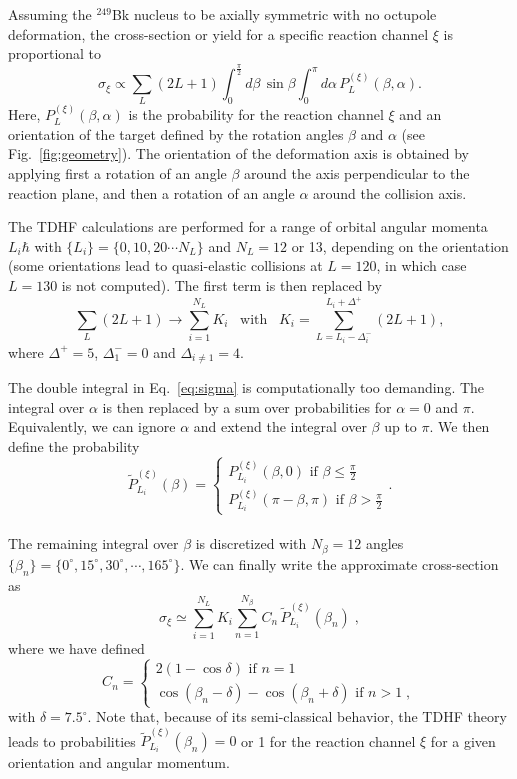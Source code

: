 \documentclass[reprint,aps,prc,twocolumn,floatfix,10pt]{revtex4-2}
\begin{document}
Assuming the $^{249}$Bk nucleus to be axially symmetric with no octupole deformation, the cross-section or yield for a specific reaction channel $\xi$ is proportional to
\begin{equation}
 \sigma_\xi\propto \sum_L (2L+1) \int_0^{\frac{\pi}{2}} d\beta \,\sin\beta \int_0^\pi d\alpha \,P_L^{(\xi)}(\beta,\alpha). \label{eq:sigma}
\end{equation}
Here, $P_L^{(\xi)}(\beta,\alpha)$ is the probability for the reaction channel $\xi$ and an orientation of the target defined by the rotation angles $\beta$ and $\alpha$ (see Fig.~\ref{fig:geometry}).
The orientation of the deformation axis is obtained by applying first a rotation of an angle $\beta$ around the axis perpendicular to the reaction plane, and then a rotation of an angle $\alpha$ around the collision axis.

The TDHF calculations are performed for a range of orbital angular momenta $L_i\hbar$ with $\{L_i\}=\{0,10,20\cdots N_L\}$ and $N_L=12$ or 13, depending on the orientation (some orientations lead to quasi-elastic collisions at $L=120$, in which case $L=130$ is not computed).
The first term is then replaced by $$\sum_L (2L+1) \rightarrow \sum_{i=1}^{N_L}K_i \,\,\,\mbox{~with~} \,\,\,
K_i=\sum_{L=L_i-\Delta_i^-}^{L_i+\Delta^+}(2L+1),$$
where $\Delta^+=5$, $\Delta_1^-=0$ and $\Delta_{i\ne 1}=4$.

The double integral in Eq.~\eqref{eq:sigma} is computationally too demanding.
The integral over $\alpha$ is then replaced by a sum over probabilities for $\alpha=0$ and $\pi$.
Equivalently, we can ignore $\alpha$ and extend the integral over $\beta$ up to $\pi$.
We then define the probability
$$\tilde{P}_{L_i}^{(\xi)}(\beta) = \begin{cases} P_{L_i}^{(\xi)}(\beta,0)\mbox{~if~}\beta\le\frac{\pi}{2}\\
P_{L_i}^{(\xi)}(\pi-\beta,\pi)\mbox{~if~}\beta > \frac{\pi}{2}\end{cases}.$$\\

The remaining integral over $\beta$ is discretized with $N_\beta=12$ angles $\{\beta_n\}=\{0^{\circ},15^{\circ},30^{\circ},\cdots ,165^{\circ}\}$.
We can finally write the approximate cross-section as
\begin{equation}
\sigma_\xi\simeq \sum_{i=1}^{N_L}K_i \sum_{n=1}^{N_\beta} C_n\, \tilde{P}^{(\xi)}_{L_i}(\beta_n)\;,
\end{equation}
where we have defined
$$C_n=\begin{cases}
2(1-\cos\delta) \mbox{~if~} n=1\\
\cos(\beta_n-\delta)-\cos(\beta_n+\delta) \mbox{~if~} n>1 \;,
      \end{cases}
$$
with $\delta=7.5^{\circ}$.
Note that, because of its semi-classical behavior, the TDHF theory leads to probabilities $\tilde{P}^{(\xi)}_{L_i}(\beta_n)=0$ or 1 for the reaction channel $\xi$ for a given orientation and angular momentum.
\end{document}
